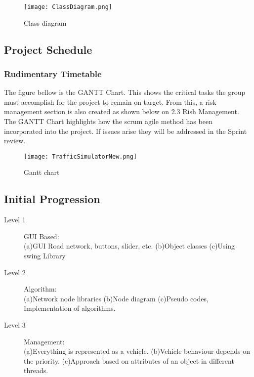 \documentclass{article} \usepackage{graphicx}
\begin{document}
				\begin{figure}[h]
							\centering
							\caption{Class diagram}	
							\texttt{[image: ClassDiagram.png]}
					\end{figure}                
                				  
                \subsection{Project Schedule}
                \subsubsection{Rudimentary Timetable}
                    The figure bellow is the GANTT Chart. This shows the critical tasks the group must accomplish for the project to remain on target. From 					this, a risk management section is also created as shown below on 2.3 Rish Management. The GANTT Chart highlights how the scrum agile 						method has been incorporated into the project. If issues arise they will be addressed in the Sprint review.

					\begin{figure}[h]
							\centering
							\caption{Gantt chart}
							\texttt{[image: TrafficSimulatorNew.png]} 
					\end{figure}										                
                    		
                \subsection{Initial Progression}
                \begin{description}
				
				\item[Level 1] GUI Based:\\
                    (a)GUI Road network, buttons, slider, etc.
                    (b)Object classes
                    (c)Using swing Library
                    
                 \item[Level 2] Algorithm:\\
                     (a)Network node libraries
                     (b)Node diagram
                     (c)Pseudo codes, Implementation of algorithms.
                    
                 \item[Level 3] Management:\\
                     (a)Everything is represented as a vehicle.
                     (b)Vehicle behaviour depends on the priority.
                     (c)Approach based on attributes of an object in different threads.
                     
                  \end{description}               
\end{document}
